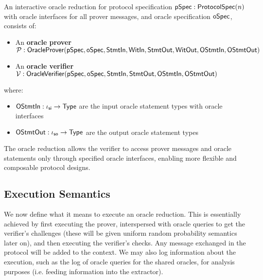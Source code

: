 \begin{definition}
    \label{def:oracle_reduction}
    An interactive oracle reduction for protocol specification $\mathsf{pSpec} : \mathsf{ProtocolSpec}(n)$ with oracle interfaces for all prover messages, and oracle specification $\mathsf{oSpec}$, consists of:
    \begin{itemize}
        \item An \textbf{oracle prover} $\mathcal{P} : \mathsf{OracleProver}(\mathsf{pSpec}, \mathsf{oSpec}, \mathsf{StmtIn}, \mathsf{WitIn}, \mathsf{StmtOut}, \mathsf{WitOut}, \mathsf{OStmtIn}, \mathsf{OStmtOut})$
        \item An \textbf{oracle verifier} $\mathcal{V} : \mathsf{OracleVerifier}(\mathsf{pSpec}, \mathsf{oSpec}, \mathsf{StmtIn}, \mathsf{StmtOut}, \mathsf{OStmtIn}, \mathsf{OStmtOut})$
    \end{itemize}

    where:
    \begin{itemize}
        \item $\mathsf{OStmtIn} : \iota_{\mathsf{si}} \to \mathsf{Type}$ are the input oracle statement types with oracle interfaces
        \item $\mathsf{OStmtOut} : \iota_{\mathsf{so}} \to \mathsf{Type}$ are the output oracle statement types
    \end{itemize}

    The oracle reduction allows the verifier to access prover messages and oracle statements only through specified oracle interfaces, enabling more flexible and composable protocol designs.
\end{definition}

\subsection{Execution Semantics}\label{sec:execution_semantics}

We now define what it means to execute an oracle reduction. This is essentially achieved by first
executing the prover, interspersed with oracle queries to get the verifier's challenges (these will
be given uniform random probability semantics later on), and then executing the verifier's checks.
Any message exchanged in the protocol will be added to the context. We may also log information
about the execution, such as the log of oracle queries for the shared oracles, for analysis purposes
(i.e. feeding information into the extractor).

